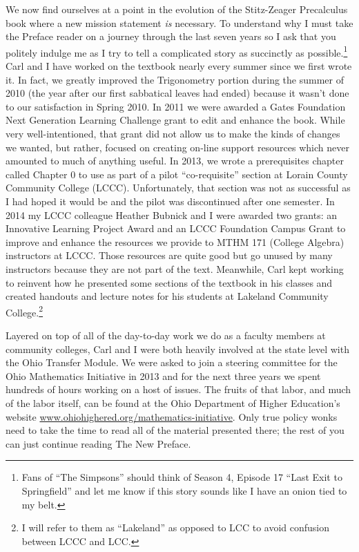 \noindent We now find ourselves at a point in the evolution of the Stitz-Zeager Precalculus book where a new mission statement \emph{is} necessary.  To understand why I must take the Preface reader on a journey through the last seven years so I ask that you politely indulge me as I try to tell a complicated story as succinctly as possible.\footnote{Fans of ``The Simpsons'' should think of Season 4, Episode 17 ``Last Exit to Springfield'' and let me know if this story sounds like I have an onion tied to my belt.}  Carl and I have worked on the textbook nearly every summer since we first wrote it.  In fact, we greatly improved the Trigonometry portion during the summer of 2010 (the year after our first sabbatical leaves had ended) because it wasn’t done to our satisfaction in Spring 2010.  In 2011 we were awarded a Gates Foundation Next Generation Learning Challenge grant to edit and enhance the book.  While very well-intentioned, that grant did not allow us to make the kinds of changes we wanted, but rather, focused on creating on-line support resources which never amounted to much of anything useful.  In 2013, we wrote a prerequisites chapter called Chapter 0 to use as part of a pilot ``co-requisite'' section at Lorain County Community College (LCCC). Unfortunately, that section was not as successful as I had hoped it would be and the pilot was discontinued after one semester.  In 2014 my LCCC colleague Heather Bubnick and I were awarded two grants: an Innovative Learning Project Award and an LCCC Foundation Campus Grant to improve and enhance the resources we provide to MTHM 171 (College Algebra) instructors at LCCC.  Those resources are quite good but go unused by many instructors because they are not part of the text.  Meanwhile, Carl kept working to reinvent how he presented some sections of the textbook in his classes and created handouts and lecture notes for his students at Lakeland Community College.\footnote{I will refer to them as ``Lakeland'' as opposed to LCC to avoid confusion between LCCC and LCC.} 

\medskip

\noindent Layered on top of all of the day-to-day work we do as a faculty members at community colleges, Carl and I were both heavily involved at the state level with the Ohio Transfer Module.  We were asked to join a steering committee for the Ohio Mathematics Initiative in 2013 and for the next three years we spent hundreds of hours working on a host of issues.  The fruits of that labor, and much of the labor itself, can be found at the Ohio Department of Higher Education's website \href{https://www.ohiohighered.org/mathematics-initiative}{www.ohiohighered.org/mathematics-initiative}.  Only true policy wonks need to take the time to read all of the material presented there; the rest of you can just continue reading The New Preface.

